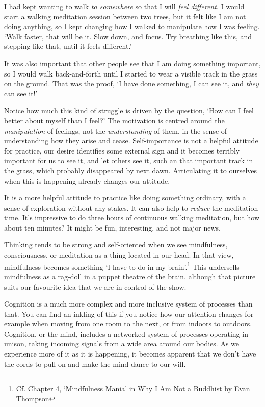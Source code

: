 I had kept wanting to walk \emph{to somewhere} so that I will \emph{feel
different}. I would start a walking meditation session between two
trees, but it felt like I am not doing anything, so I kept changing how
I walked to manipulate how I was feeling. `Walk faster, that will be it.
Slow down, and focus. Try breathing like this, and stepping like that,
until it feels different.'

It was also important that other people see that I am doing something
important, so I would walk back-and-forth until I started to wear a
visible track in the grass on the ground. That was the proof, `I have
done something, I can see it, and \emph{they} can see it!'

Notice how much this kind of struggle is driven by the question, `How
can I feel better about myself than I feel?' The motivation is centred
around the \emph{manipulation} of feelings, not the \emph{understanding}
of them, in the sense of understanding how they arise and cease.
Self-importance is not a helpful attitude for practice, our desire
identifies some external sign and it becomes terribly important for us
to see it, and let others see it, such an that important track in the
grass, which probably disappeared by next dawn. Articulating it to
ourselves when this is happening already changes our attitude.

It is a more helpful attitude to practice like doing something ordinary,
with a sense of exploration without any stakes. It can also help to
\emph{reduce} the meditation time. It's impressive to do three hours of
continuous walking meditation, but how about ten minutes? It might be
fun, interesting, and not major news.


Thinking tends to be strong and self-oriented when we see mindfulness,
consciousness, or meditation as a thing located in our head. In that
view, mindfulness becomes something `I have to do in my
brain'.\footnote{Cf. Chapter 4, `Mindfulness Mania' in
  \href{https://www.goodreads.com/book/show/44439993-why-i-am-not-a-buddhist}{Why
  I Am Not a Buddhist by Evan Thompson}} This undersells mindfulness as
a rag-doll in a puppet theatre of the brain, although that picture suits
our favourite idea that we are in control of the show.

Cognition is a much more complex and more inclusive system of processes
than that. You can find an inkling of this if you notice how our
attention changes for example when moving from one room to the next, or
from indoors to outdoors. Cognition, or the mind, includes a networked
system of processes operating in unison, taking incoming signals from a
wide area around our bodies. As we experience more of it as it is
happening, it becomes apparent that we don't have the cords to pull on
and make the mind dance to our will.

